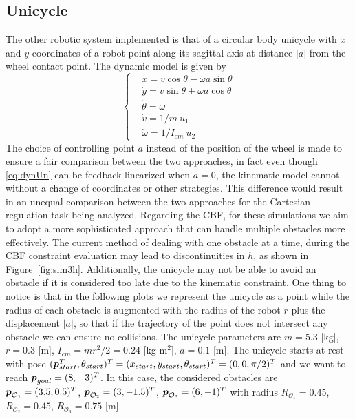 \subsection{Unicycle}
The other robotic system implemented is that of a circular body unicycle with $x$ and $y$ coordinates of a robot point along its sagittal axis at distance $|a|$ from the wheel contact point. The dynamic model is given by
\begin{equation}
\left\{ \begin{aligned} \label{eq:dynUn}
    &\dot{x}      = v\cos\theta -\omega a\sin\theta \\
    &\dot{y}      =  v\sin\theta +\omega a\cos\theta \\
    &\dot{\theta} =  \omega \\
    &\dot{v}      =   1/m~u_1 \\
    &\dot{\omega}   = 1/I_{cm}~u_2 
\end{aligned} \right.
\end{equation}
\noindent
The choice of controlling point $a$ instead of the position of the wheel is made to ensure a fair comparison between the two approaches, in fact even though \eqref{eq:dynUn} can be feedback linearized when $a=0$, the kinematic model cannot without a change of coordinates or other strategies. This difference would result in an unequal comparison between the two approaches for the Cartesian regulation task being analyzed.
Regarding the CBF, for these simulations we aim to adopt a more sophisticated approach that can handle multiple obstacles more effectively. The current method of dealing with one obstacle at a time, during the CBF constraint evaluation may lead to discontinuities in $h$, as shown in Figure~\ref{fig:sim3h}. Additionally, the unicycle may not be able to avoid an obstacle if it is considered too late due to the kinematic constraint. One thing to notice is that in the following plots we represent the unicycle as a point while the radius of each obstacle is augmented with the radius of the robot $r$ plus the displacement $|a|$, so that if the trajectory of the point does not intersect any obstacle we can ensure no collisions. The unicycle parameters are $m=5.3$ [kg], $r=0.3$ [m], $I_{cm}=mr^2/2=0.24$ [kg $\text{m}^2$], $a=0.1$ [m]. The unicycle starts at rest with pose $(\boldsymbol{p}_{start}^T,\theta_{start})^T=(x_{start},y_{start},\theta_{start})^T = (0,0,\pi/2)^T$ and we want to reach $\boldsymbol{p}_{goal}=(8,-3)^T$. In this case, the considered obstacles are $\boldsymbol{p}_{\mathcal{O}_1}=(3.5,0.5)^T$, $\boldsymbol{p}_{\mathcal{O}_2}=(3,-1.5)^T$, $\boldsymbol{p}_{\mathcal{O}_3}=(6,-1)^T$ with radius $R_{\mathcal{O}_1}=0.45$, $R_{\mathcal{O}_2}=0.45$, $R_{\mathcal{O}_3}=0.75$ [m].

